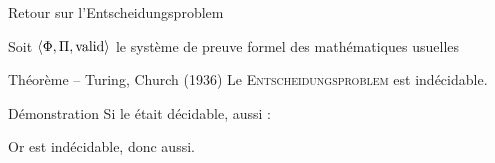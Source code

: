 
\begingroup


\begin{frame}{Retour sur l'Entscheidungsproblem}

  Soit $\langle \Phi, \Pi, \operatorname{valid} \rangle$ le système de preuve formel des mathématiques usuelles

  
  \begin{block}{Théorème -- Turing, Church (1936)}
    Le \textsc{Entscheidungsproblem} est indécidable. 
  \end{block}

  \pause 
  \begin{block}{Démonstration}
    Si le  était décidable,  aussi :

    \begin{algorithm}[H]
    \end{algorithm}

    Or  est indécidable, donc  aussi. 
  \end{block}
  
\end{frame}

\endgroup
